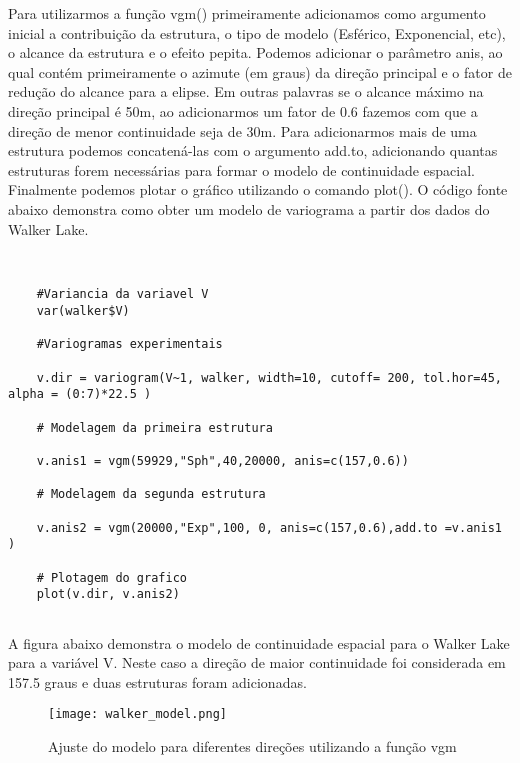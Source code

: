 Para utilizarmos a função vgm() primeiramente adicionamos como argumento inicial a contribuição da estrutura, o tipo de modelo (Esférico, Exponencial, etc), o alcance da estrutura e o efeito pepita. Podemos adicionar o parâmetro anis, ao qual contém primeiramente o azimute (em graus) da direção principal e o fator de redução do alcance para a elipse. Em outras palavras se o alcance máximo na direção principal é 50m, ao adicionarmos um fator de 0.6 fazemos com que a direção de menor continuidade seja de 30m. Para adicionarmos mais de uma estrutura podemos concatená-las com o argumento add.to, adicionando quantas estruturas forem necessárias para formar o modelo de continuidade espacial. Finalmente podemos plotar o gráfico utilizando o comando plot(). O código fonte abaixo demonstra como obter um modelo de variograma a partir dos dados do Walker Lake.

\begin{scriptsize}
	\estiloR
	\begin{lstlisting}[caption={Criação de um vetor em R}, label=lst:rcode]
	
	
	#Variancia da variavel V
	var(walker$V)
	
	#Variogramas experimentais
	
	v.dir = variogram(V~1, walker, width=10, cutoff= 200, tol.hor=45, alpha = (0:7)*22.5 )
	
	# Modelagem da primeira estrutura 
	
	v.anis1 = vgm(59929,"Sph",40,20000, anis=c(157,0.6))
	
	# Modelagem da segunda estrutura 
	
	v.anis2 = vgm(20000,"Exp",100, 0, anis=c(157,0.6),add.to =v.anis1 )
	
	# Plotagem do grafico
	plot(v.dir, v.anis2)
	
	\end{lstlisting}
\end{scriptsize}

A figura abaixo demonstra o modelo de continuidade espacial para o Walker Lake para a variável V. Neste caso a direção de maior continuidade foi considerada em 157.5 graus e duas estruturas foram adicionadas. 

\FloatBarrier
\begin{figure}[H]
	\centering
	\texttt{[image: walker\_model.png]}	
	\caption{Ajuste do modelo para diferentes direções utilizando a função vgm}
	\label{walk}
\end{figure}
\FloatBarrier


